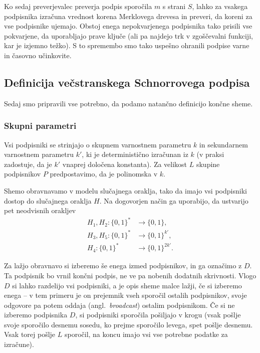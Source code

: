 Ko sedaj preverjevalec preverja podpis sporočila $m$ s strani $S$, lahko za vsakega podpisnika
izračuna vrednost korena Merklovega drevesa in preveri, da koreni za vse podpisnike ujemajo. Obstoj
enega nepokvarjenega podpisnika tako prisili vse pokvarjene, da uporabljajo prave ključe (ali pa
najdejo trk v zgoščevalni funkciji, kar je izjemno težko). S to spremembo smo tako uspešno ohranili
podpise varne in časovno učinkovite.

\subsection{Definicija večstranskega Schnorrovega podpisa}
\label{sec:def_multi_schnorr}
Sedaj smo pripravili vse potrebno, da podamo natančno definicijo končne sheme.

\subsubsection{Skupni parametri}
Vsi podpisniki se strinjajo o skupnem varnostnem parametru $k$ in sekundarnem varnostnem parametru
$k'$, ki je deterministično izračunan iz $k$ (v praksi zadostuje, da je $k'$ vnaprej določena konstanta).
Za velikost $L$ skupine podpisnikov $P$ predpostavimo, da je polinomska v $k$.

Shemo obravnavamo v modelu slučajnega oraklja, tako da imajo vsi podpisniki dostop do slučajnega
oraklja $H$. Na dogovorjen način ga uporabijo, da ustvarijo pet neodvisnih orakljev
\begin{align*}
    H_1, H_2: \{0, 1\}^* &\rightarrow \{0, 1\}, \\
    H_3, H_5: \{0, 1\}^* &\rightarrow \{0, 1\}^{k'}, \\
    H_4: \{0, 1\}^* &\rightarrow \{0, 1\}^{2k'}.
\end{align*}

Za lažjo obravnavo si izberemo še enega izmed podpisnikov, in ga označimo z $D$. Ta podpisnik bo
vrnil končni podpis, ne ve pa nobenih dodatnih skrivnosti. Vlogo $D$ si lahko razdelijo vsi podpisniki,
a je opis sheme malce lažji, če si izberemo enega -- v tem primeru je on prejemnik vseh sporočil
ostalih podpisnikov, svoje odgovore pa potem oddaja (angl.\ \textit{broadcast}) ostalim podpisnikom.
Če si ne izberemo podpisnika $D$, si podpisniki sporočila pošiljajo v krogu (vsak pošlje svoje sporočilo
desnemu sosedu, ko prejme sporočilo levega, spet pošlje desnemu. Vsak torej pošlje $L$ sporočil, na
koncu imajo vsi vse potrebne podatke za izračune).


